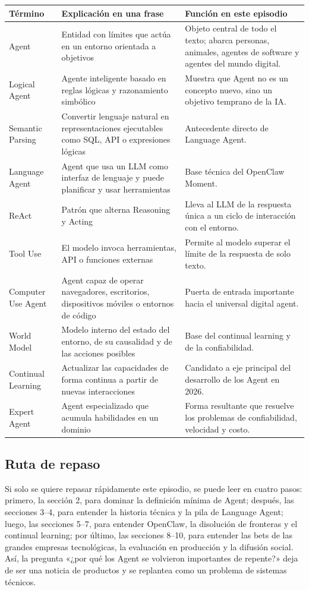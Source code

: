 \documentclass[a4paper]{article}
\begin{document}
\begin{longtable}{p{}p{}p{}}
\toprule
Término & Explicación en una frase & Función en este episodio \\
\midrule
Agent & Entidad con límites que actúa en un entorno orientada a objetivos & Objeto central de todo el texto; abarca personas, animales, agentes de software y agentes del mundo digital. \\
Logical Agent & Agente inteligente basado en reglas lógicas y razonamiento simbólico & Muestra que Agent no es un concepto nuevo, sino un objetivo temprano de la IA. \\
Semantic Parsing & Convertir lenguaje natural en representaciones ejecutables como SQL, API o expresiones lógicas & Antecedente directo de Language Agent. \\
Language Agent & Agent que usa un LLM como interfaz de lenguaje y puede planificar y usar herramientas & Base técnica del OpenClaw Moment. \\
ReAct & Patrón que alterna Reasoning y Acting & Lleva al LLM de la respuesta única a un ciclo de interacción con el entorno. \\
Tool Use & El modelo invoca herramientas, API o funciones externas & Permite al modelo superar el límite de la respuesta de solo texto. \\
Computer Use Agent & Agent capaz de operar navegadores, escritorios, dispositivos móviles o entornos de código & Puerta de entrada importante hacia el universal digital agent. \\
World Model & Modelo interno del estado del entorno, de su causalidad y de las acciones posibles & Base del continual learning y de la confiabilidad. \\
Continual Learning & Actualizar las capacidades de forma continua a partir de nuevas interacciones & Candidato a eje principal del desarrollo de los Agent en 2026. \\
Expert Agent & Agent especializado que acumula habilidades en un dominio & Forma resultante que resuelve los problemas de confiabilidad, velocidad y costo. \\
\bottomrule
\end{longtable}

\subsection{Ruta de repaso}

Si solo se quiere repasar rápidamente este episodio, se puede leer en cuatro pasos: primero, la sección 2, para dominar la definición mínima de Agent; después, las secciones 3--4, para entender la historia técnica y la pila de Language Agent; luego, las secciones 5--7, para entender OpenClaw, la disolución de fronteras y el continual learning; por último, las secciones 8--10, para entender las bets de las grandes empresas tecnológicas, la evaluación en producción y la difusión social. Así, la pregunta «¿por qué los Agent se volvieron importantes de repente?» deja de ser una noticia de productos y se replantea como un problema de sistemas técnicos.
\end{document}
